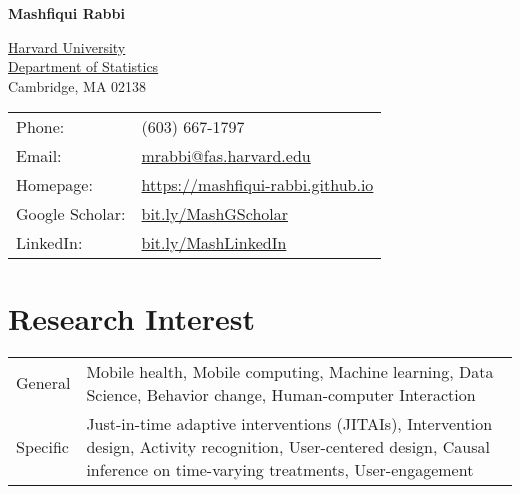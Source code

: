 \documentclass[10pt,fullpage]{article}
\def\name{Mashfiqui Rabbi}
\begin{document}


\centerline{\Large \bf \name}


\begin{minipage}{0.50\linewidth}
  \href{http://www.cornell.edu/}{Harvard University} \\
  \href{http://infosci.cornell.edu/}{Department of Statistics} \\
  Cambridge, MA 02138
\end{minipage}
\begin{minipage}{0.50\linewidth}
  \begin{tabular}{ll}
    Phone: & (603) 667-1797 \\
    Email: & \href{mailto:mrabbi@umich.edu}{mrabbi@fas.harvard.edu} \\
    Homepage: & \href{https://mashfiqui-rabbi.github.io/}{https://mashfiqui-rabbi.github.io}\\
    Google Scholar: & \href{http://bit.ly/MashGScholar}{bit.ly/MashGScholar}\\
    LinkedIn: & \href{http://bit.ly/MashLinkedIn}{bit.ly/MashLinkedIn}
  \end{tabular}
\end{minipage}



\section*{\textbf{Research Interest}}
\vspace{-0.5em}
\begin{longtable}{p{0.7in}|p{5.5in}}
		General & Mobile health, Mobile computing, Machine learning, Data Science, Behavior change, Human-computer Interaction \vspace{0.15cm}\\
	Specific & Just-in-time adaptive interventions (JITAIs), Intervention design, Activity recognition, User-centered design, Causal inference on time-varying treatments, User-engagement \\
\end{longtable}
\end{document}
